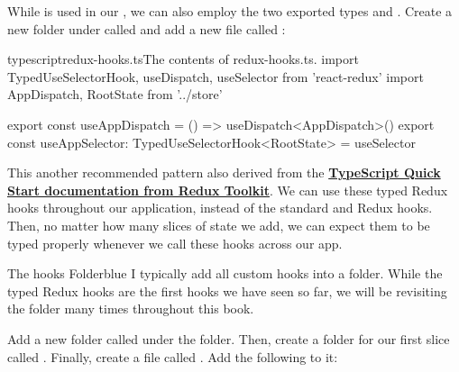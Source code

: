 \documentclass[paper=6in:9in,pagesize=pdftex,headinclude=on,footinclude=on,12pt,twoside]{scrbook}
\newcommand{\link}[2]{\textbf{\textcolor{monokaiPink}{\href{#2}{#1}}}}
\begin{document}
While  is used in our , we can also employ the two exported types  and . Create a new folder under  called  and add a new file called :

\begin{codeInput}{typescript}{redux-hooks.ts}{The contents of redux-hooks.ts.}
import { TypedUseSelectorHook, useDispatch, useSelector } from 'react-redux'
import { AppDispatch, RootState } from '../store'

export const useAppDispatch = () => useDispatch<AppDispatch>()
export const useAppSelector: TypedUseSelectorHook<RootState> = useSelector
\end{codeInput}

This another recommended pattern also derived from the \link{TypeScript Quick Start documentation from Redux Toolkit}{https://redux-toolkit.js.org/tutorials/typescript}. We can use these typed Redux hooks throughout our application, instead of the standard  and  Redux hooks. Then, no matter how many slices of state we add, we can expect them to be typed properly whenever we call these hooks across our app.

\begin{highlightBox}{The hooks Folder}{blue}{\information}
I typically add all custom hooks into a  folder. While the typed Redux hooks are the first hooks we have seen so far, we will be revisiting the  folder many times throughout this book.
\end{highlightBox}


Add a new folder called  under the  folder. Then, create a folder for our first slice called . Finally, create a file called . Add the following to it:
\end{document}
